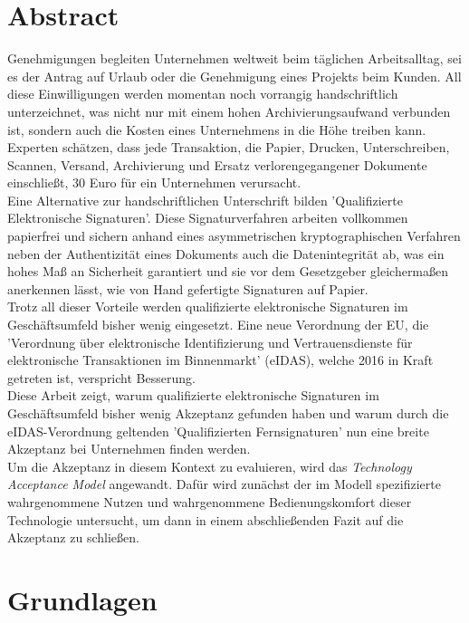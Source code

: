 \documentclass[deutsch]{lib/llncs/llncs}
\begin{document}
\section{Abstract}
Genehmigungen begleiten Unternehmen weltweit beim täglichen Arbeitsalltag, sei es der Antrag auf Urlaub oder die Genehmigung eines Projekts beim Kunden. All diese Einwilligungen werden momentan noch vorrangig handschriftlich unterzeichnet, was nicht nur mit einem hohen Archivierungsaufwand verbunden ist, sondern auch die Kosten eines Unternehmens in die Höhe treiben kann. Experten schätzen, dass jede Transaktion, die Papier, Drucken, Unterschreiben, Scannen, Versand, Archivierung und Ersatz verlorengegangener Dokumente einschließt, 30 Euro für ein Unternehmen verursacht. \\
Eine Alternative zur handschriftlichen Unterschrift bilden 'Qualifizierte Elektronische Signaturen'. Diese Signaturverfahren arbeiten vollkommen papierfrei und sichern anhand eines asymmetrischen kryptographischen Verfahren neben der Authentizität eines Dokuments auch die Datenintegrität ab, was ein hohes Maß an Sicherheit garantiert und sie vor dem Gesetzgeber gleichermaßen anerkennen lässt, wie von Hand gefertigte Signaturen auf Papier. \\
Trotz all dieser Vorteile werden qualifizierte elektronische Signaturen im Geschäftsumfeld bisher wenig eingesetzt. Eine neue Verordnung der EU, die 'Verordnung über elektronische Identifizierung und Vertrauensdienste für elektronische Transaktionen im Binnenmarkt' (eIDAS), welche 2016 in Kraft getreten ist, verspricht Besserung. \\
Diese Arbeit zeigt, warum qualifizierte elektronische Signaturen im Geschäftsumfeld bisher wenig Akzeptanz gefunden haben und warum durch die eIDAS-Verordnung geltenden 'Qualifizierten Fernsignaturen' nun eine breite Akzeptanz bei Unternehmen finden werden. \\
Um die Akzeptanz in diesem Kontext zu evaluieren, wird das \textit{Technology Acceptance Model} angewandt.
Dafür wird zunächst der im Modell spezifizierte wahrgenommene Nutzen und wahrgenommene Bedienungskomfort dieser Technologie untersucht, um dann in einem abschließenden Fazit auf die Akzeptanz zu schließen. 


\newpage


\section{Grundlagen}
\end{document}
